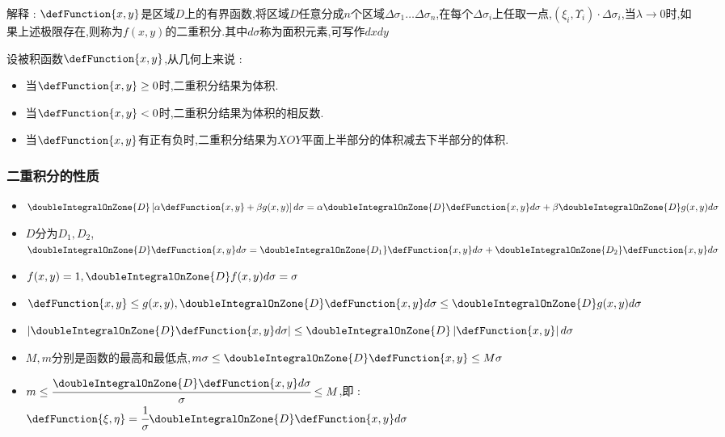 {{{    解释 : $\defFunction{x,y}$是区域$D$上的有界函数,将区域$D$任意分成$n$个区域$\Delta\sigma_1\dots\Delta\sigma_n$,在每个$\Delta\sigma_i$上任取一点,$(\xi_i,\varUpsilon_i)\cdot\Delta\sigma_i$,当$\lambda \to 0$时,如果上述极限存在,则称为$f(x,y)$的二重积分.其中$d\sigma$称为面积元素,可写作$dxdy$

    设被积函数$\defFunction{x,y}$,从几何上来说 :
    \begin{itemize}
      \item 当$\defFunction{x,y} \geq 0$时,二重积分结果为体积.
      \item 当$\defFunction{x,y} < 0$时,二重积分结果为体积的相反数.
      \item 当$\defFunction{x,y}$有正有负时,二重积分结果为$XOY$平面上半部分的体积减去下半部分的体积.
    \end{itemize}
  }%

  \subsubsection{二重积分的性质}{
    \begin{itemize}
      \item $\doubleIntegralOnZone{D}\left[\alpha\defFunction{x,y} + \beta g(x,y)\right]d\sigma = \alpha\doubleIntegralOnZone{D}\defFunction{x,y}d\sigma + \beta\doubleIntegralOnZone{D}g(x,y)d\sigma$
      \item $D$分为$D_1,D_2$,$\doubleIntegralOnZone{D}\defFunction{x,y}d\sigma = \doubleIntegralOnZone{D_1}\defFunction{x,y}d\sigma + \doubleIntegralOnZone{D_2}\defFunction{x,y}d\sigma$
      \item $f(x,y) = 1,\doubleIntegralOnZone{D}f(x,y)d\sigma = \sigma$
      \item $\defFunction{x,y} \leq g(x,y), \doubleIntegralOnZone{D}\defFunction{x,y}d\sigma \leq \doubleIntegralOnZone{D}g(x,y)d\sigma$
      \item $\left|\doubleIntegralOnZone{D}\defFunction{x,y}d\sigma\right| \leq \doubleIntegralOnZone{D}\left|\defFunction{x,y}\right|d\sigma$
      \item $M,m$分别是函数的最高和最低点,$m\sigma \leq \doubleIntegralOnZone{D}\defFunction{x,y} \leq M\sigma$
      \item $m \leq \cfrac{\doubleIntegralOnZone{D}\defFunction{x,y}d\sigma}{\sigma} \leq M$,即 : $\defFunction{\xi,\eta} = \cfrac{1}{\sigma}\doubleIntegralOnZone{D}\defFunction{x,y}d\sigma$
    \end{itemize}
  }%

}}
